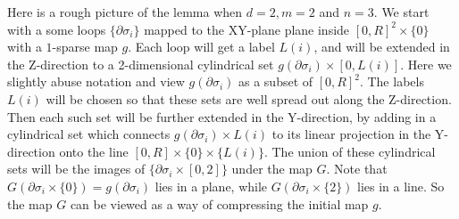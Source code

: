 \documentclass[12pt]{article}
\begin{document}
	
	Here is a rough picture of the lemma when $d=2, m=2$ and $n=3$. We start with a some loops $\{\partial \sigma_i\}$ mapped to the XY-plane plane inside $[0,R]^2 \times \{0\}$ with a $1$-sparse map $g$. Each loop will get a label $L(i)$, and will be extended in the Z-direction to a 2-dimensional cylindrical set $g(\partial \sigma_i) \times [0,L(i)]$. Here we slightly abuse notation and view $g(\partial \sigma_i)$ as a subset of $[0,R]^2$. The labels $L(i)$ will be chosen so that these sets are well spread out along the Z-direction. Then each such set will be further extended in the Y-direction, by adding in a cylindrical set which connects $g(\partial \sigma_i) \times {L(i)}$ to its linear projection in the Y-direction onto the line $[0,R] \times \{0\} \times \{L(i)\}$. The union of these cylindrical sets will be the images of $\{\partial \sigma_i \times [0,2]\}$ under the map $G$. Note that $G(\partial \sigma_i \times \{0\}) = g(\partial \sigma_i)$ lies in a plane, while $G(\partial \sigma_i \times \{2\})$ lies in a line. So the map $G$ can be viewed as a way of compressing the initial map $g$. 
	
\end{document}
